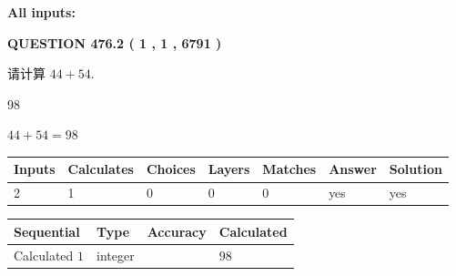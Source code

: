 \documentclass{ctexart}
\begin{document}
   
   
   
\noindent{}
   
   
   
   
\noindent\vspace{0.1in}\hspace{-0.08in} {\textbf{\Large{All inputs: }}}
   
   
  
\vspace{0.2in}
  
{\textbf{\Large{QUESTION
476.2 
 ( 1 , 1 , 6791 )
}}}
  
  
 
请计算 $ %
44 +  %
54 $.
 
 
 
\noindent{}
 
 

98
 
 
\noindent{}
 
 

 
 
 
\noindent{}
 
 

$ %
44 +  %
54=   %
98$
 
 
\noindent{}
 
 

 
   
   
   
   
\noindent\begin{tabular}{|l|l|l|l|l|l|l|}
 \hline
Inputs & Calculates & Choices & Layers & Matches & Answer & Solution \\ \hline
 2  & 
 1  & 
 0
  & 
 0  & 
 0  & 
  yes & 
  yes 
  \\ \hline
 \end{tabular}
   
   
   
   
\noindent{}
   
   
  
  
\noindent\begin{tabular}{|l|l|l|l|}
\hline
 Sequential & Type & Accuracy & Calculated \\ 
\hline
 
 
  Calculated $  1 $ & integer &  & 
  $ 98 $ 
 \\  \hline  
 \end{tabular}
   
\end{document}
